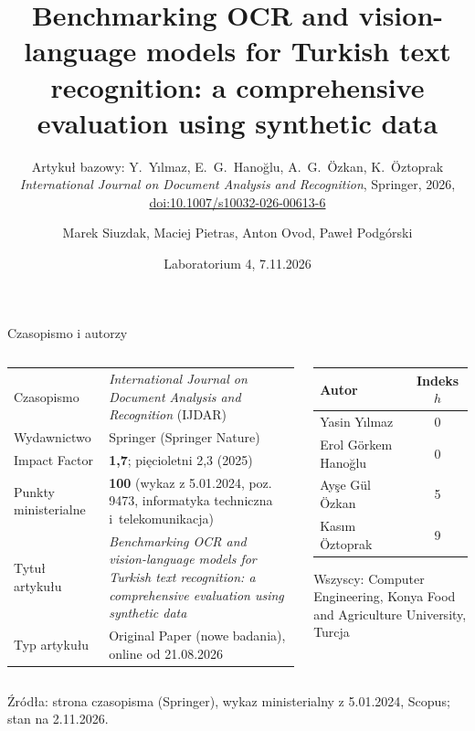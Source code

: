 \documentclass[aspectratio=169,11pt]{beamer}
\title{Benchmarking OCR and vision-language models for Turkish text recognition: a comprehensive evaluation using synthetic data}
\subtitle{Artykuł bazowy: Y.~Yılmaz, E.~G.~Hanoğlu, A.~G.~Özkan, K.~Öztoprak\\
  \emph{International Journal on Document Analysis and Recognition}, Springer, 2026,
  \href{https://doi.org/10.1007/s10032-026-00613-6}{doi:10.1007/s10032-026-00613-6}}
\author{Marek Siuzdak, Maciej Pietras, Anton Ovod, Paweł Podgórski}
\date{Laboratorium 4, 7.11.2026}
\newcommand{\zrodlo}[1]{\par\vfill{\tiny\color{black!65}#1\par}}
\begin{document}
\begin{frame}
  \titlepage
\end{frame}

\begin{frame}{Czasopismo i autorzy}
  \begin{columns}[T]
    \begin{column}{0.60\textwidth}
      \small
      \begin{tabular}{@{}L{2.15cm}P{5.8cm}@{}}
        Czasopismo & \emph{International Journal on Document Analysis and Recognition} (IJDAR) \\[3pt]
        Wydawnictwo & Springer (Springer Nature) \\[3pt]
        Impact Factor & \textbf{1,7}; pięcioletni 2,3 (2025) \\[3pt]
        Punkty ministerialne & \textbf{100} (wykaz z 5.01.2024, poz. 9473, informatyka techniczna i~telekomunikacja) \\[3pt]
        Tytuł artykułu & \emph{Benchmarking OCR and vision-language models for Turkish text recognition:
          a comprehensive evaluation using synthetic data} \\[3pt]
        Typ artykułu & Original Paper (nowe badania), online od 21.08.2026
      \end{tabular}
    \end{column}
    \begin{column}{0.37\textwidth}
      \small
      \begin{tabular}{@{}lc@{}}
        \toprule
        Autor & Indeks $h$ \\
        \midrule
        Yasin Yılmaz & 0 \\
        Erol Görkem Hanoğlu & 0 \\
        Ayşe Gül Özkan & 5 \\
        Kasım Öztoprak & 9 \\
        \bottomrule
      \end{tabular}

      \vspace{6pt}
      \footnotesize
      Wszyscy: Computer Engineering, Konya Food and Agriculture University, Turcja
    \end{column}
  \end{columns}
  \zrodlo{Źródła: strona czasopisma (Springer), wykaz ministerialny z 5.01.2024, Scopus; stan na 2.11.2026.}
\end{frame}
\end{document}

